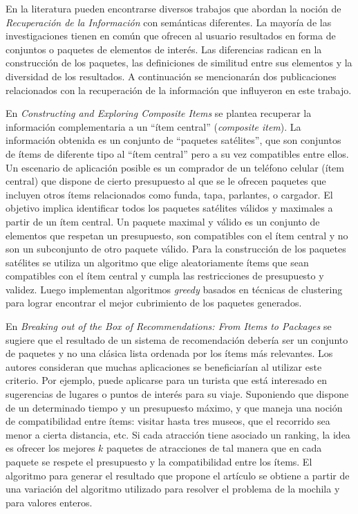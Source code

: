 En la literatura pueden encontrarse diversos trabajos que abordan la noción de \emph{Recuperación de la Información} con semánticas diferentes. La mayoría de las investigaciones tienen en común que ofrecen al usuario resultados en forma de conjuntos o paquetes de elementos de interés. Las diferencias radican en la construcción de los paquetes, las definiciones de similitud entre sus elementos y la diversidad de los resultados. A continuación se mencionarán dos publicaciones relacionados con la recuperación de la información que influyeron en este trabajo. 

En \textit{Constructing and Exploring Composite Items} \cite{BasuRoy:2010:CEC:1807167.1807258} se plantea recuperar la información complementaria a un ``ítem central'' (\textit{composite item}). La información obtenida es un conjunto de ``paquetes satélites'', que son conjuntos de ítems de diferente tipo al ``ítem central'' pero a su vez compatibles entre ellos. Un escenario de aplicación posible es un comprador de un teléfono celular (ítem central) que dispone de cierto presupuesto al que se le ofrecen paquetes que incluyen otros ítems relacionados como funda, tapa, parlantes, o cargador. El objetivo implica identificar todos los paquetes satélites válidos y maximales a partir de un ítem central. Un paquete maximal y válido es un conjunto de elementos que respetan un presupuesto, son compatibles con el ítem central y no son un subconjunto de otro paquete válido. Para la construcción de los paquetes satélites se utiliza un algoritmo que elige aleatoriamente ítems que sean compatibles con el ítem central y cumpla las restricciones de presupuesto y validez. Luego implementan algoritmos \emph{greedy} basados en técnicas de clustering para lograr encontrar el mejor cubrimiento de los paquetes generados.

En \textit{Breaking out of the Box of Recommendations: From Items to Packages} \cite{Xie:2010:BOB:1864708.1864739} se sugiere que el resultado de un sistema de recomendación debería ser un conjunto de paquetes y no una clásica lista ordenada por los ítems más relevantes. Los autores consideran que muchas aplicaciones se beneficiarían al utilizar este criterio. Por ejemplo, puede aplicarse para un turista que está interesado en sugerencias de lugares o puntos de interés para su viaje. Suponiendo que dispone de un determinado tiempo y un presupuesto máximo, y que maneja una noción de compatibilidad entre ítems: visitar hasta tres museos, que el recorrido sea menor a cierta distancia, etc. Si cada atracción tiene asociado un ranking, la idea es ofrecer los mejores $k$ paquetes de atracciones de tal manera que en cada paquete se respete el presupuesto y la compatibilidad entre los ítems. El algoritmo para generar el resultado que propone el artículo se obtiene a partir de una variación del algoritmo utilizado para resolver el problema de la mochila \cite{DBLP:conf/coco/Karp72} y \cite{Gossett:2009:DMP:1717238} para valores enteros. 

